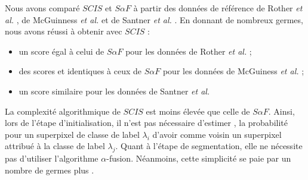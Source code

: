 Nous avons comparé $SCIS$ et $S \alpha F$ à partir des données de référence de Rother \textit{et al.}  \cite{rother2004grabcut}, de  McGuinness \textit{et al.} \cite{mcguinness2010comparative}  et de Santner \textit{et al. } \cite{santner2010interactive}. En donnant de nombreux germes, nous avons réussi à obtenir avec $SCIS$ :
\begin{itemize}
\item un score   égal à celui de $S \alpha F$ pour les données de Rother \textit{et al.} ; 
\item des scores  et   identiques à ceux de $S \alpha F$ pour les données de McGuiness \textit{et al.} ;
\item  un score   similaire pour les données de Santner \textit{et al.}
\end{itemize}

La complexité algorithmique de $SCIS$ est moins élevée que celle de $S \alpha F$. Ainsi, lors de l'étape d'initialisation, il n'est pas nécessaire d'estimer , la probabilité pour un superpixel de classe de label $\lambda_{i}$ d'avoir comme voisin un superpixel attribué à la classe de label $\lambda_{j}$. Quant à l'étape de segmentation, elle ne nécessite pas d'utiliser l'algorithme $\alpha$-fusion. Néanmoins, cette simplicité se paie par un nombre de germes plus . 


